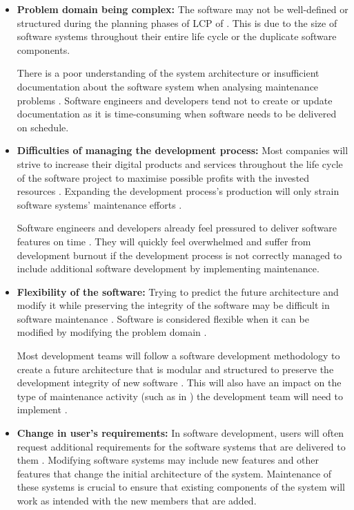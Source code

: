 \begin{itemize}
	\item \textbf{Problem domain being complex:} The software may not be well-defined or structured during the planning phases of LCP of . This is due to the size of software systems throughout their entire life cycle or the duplicate software components. \par There is a poor understanding of the system architecture or insufficient documentation about the software system when analysing maintenance problems \cite{Galster2019}. Software engineers and developers tend not to create or update documentation as it is time-consuming when software needs to be delivered on schedule.
	\item \textbf{Difficulties of managing the development process:} Most companies will strive to increase their digital products and services throughout the life cycle of the software project to maximise possible profits with the invested resources \cite{Niu2018}. Expanding the development process's production will only strain software systems' maintenance efforts \cite{Sneed2004}. \par Software engineers and developers already feel pressured to deliver software features on time \cite{Galster2019, Lenarduzzi2017}. They will quickly feel overwhelmed and suffer from development burnout if the development process is not correctly managed to include additional software development by implementing maintenance.
	\item \textbf{Flexibility of the software:} Trying to predict the future architecture and modify it while preserving the integrity of the software may be difficult in software maintenance \cite{Garlan1999}. Software is considered flexible when it can be modified by modifying the problem domain \cite{Ogheneovo2014}. \par Most development teams will follow a software development methodology to create a future architecture that is modular and structured to preserve the development integrity of new software \cite{Vijayasarathy2016}. This will also have an impact on the type of maintenance activity (such as in ) the development team will need to implement \cite{Thamburaj2017, Snipes2018}.
	\item \textbf{Change in user's requirements:} In software development, users will often request additional requirements for the software systems that are delivered to them \cite{Ogheneovo2014}. Modifying software systems may include new features and other features that change the initial architecture of the system. Maintenance of these systems is crucial to ensure that existing components of the system will work as intended with the new members that are added.

\end{itemize}
